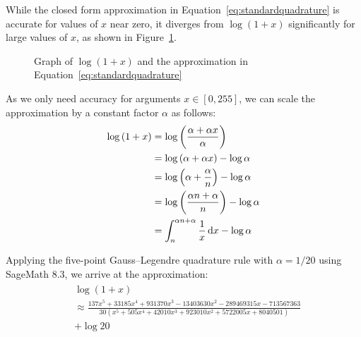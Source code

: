 While the closed form approximation in Equation~\ref{eq:standardquadrature} is accurate for values of $x$ near zero, it diverges from $\log{(1+x)}$ significantly for large values of $x$, as shown in Figure~\ref{fig:standardquadrature}.
\begin{figure}[!ht]
    \centering
    \caption{Graph of $\log{(1+x)}$ and the approximation in Equation~\ref{eq:standardquadrature}}
    \label{fig:standardquadrature}
\end{figure}

As we only need accuracy for arguments $x \in [0, 255]$, we can scale the approximation by a constant factor $\alpha$ as follows:
\begin{align*}
  \log{(1+x)} &= \log{\left(\frac{\alpha + \alpha x}{\alpha}\right)}\\
  &= \log{(\alpha + \alpha x)} - \log{\alpha}\\
  &= \log{\left(\alpha+\frac{\alpha}{n}\right)} - \log{\alpha}\\
  &= \log{\left(\frac{\alpha n + \alpha}{n}\right)} - \log{\alpha}\\
  &= \int_{n}^{\alpha n + \alpha}{\frac{1}{x}\mathop{}\!\mathrm{d} x} - \log{\alpha}
\end{align*}

Applying the five-point Gauss--Legendre quadrature rule with $\alpha = 1/20$ using SageMath 8.3, we arrive at the approximation:
\begin{align}\label{eq:scaledquadrature}
  \begin{split}
    &\log(1+x) \\
    &\approx \frac{137x^5 + 33185x^4 + 931370x^3 - 13403630x^2 - 289469315x - 713567363}
    {30(x^5 + 505x^4 + 42010x^3 + 923010x^2 + 5722005x + 8040501)} \\
    &+ \log{20}
  \end{split}
\end{align}

